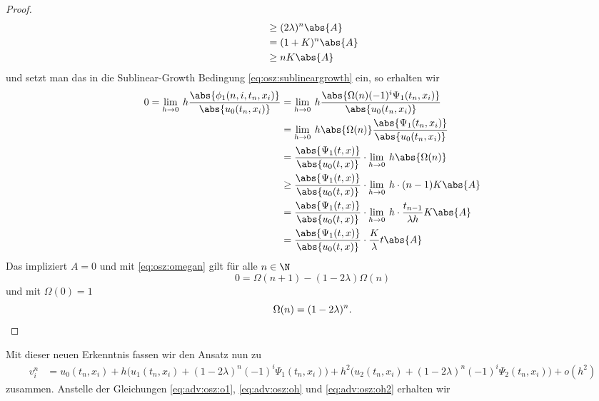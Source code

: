 \begin{proof}
\begin{align*}
&\geq (2 \lambda)^n \abs{A}\\
&= (1 + K)^n \abs{A}\\
&\geq n K  \abs{A}\\
\end{align*}
und setzt man das in die Sublinear-Growth Bedingung \eqref{eq:osz:sublineargrowth} ein, so erhalten wir
\begin{align*}
0 = \lim_{h \to 0} \: h \frac{\abs{\phi_1(n, i, t_n, x_i)}}{\abs{u_0(t_n, x_i)}}
&= \lim_{h \to 0} \: h \frac{\abs{\Omega(n) (-1)^i \Psi_1(t_n, x_i)}}{\abs{u_0(t_n, x_i)}}\\
&= \lim_{h \to 0} \: h \abs{\Omega(n)} \frac{\abs{\Psi_1(t_n, x_i)}}{\abs{u_0(t_n, x_i)}}\\
&= \frac{\abs{\Psi_1(t, x)}}{\abs{u_0(t, x)}} \cdot \lim_{h \to 0} \: h \abs{\Omega(n)}\\
&\geq \frac{\abs{\Psi_1(t, x)}}{\abs{u_0(t, x)}} \cdot \lim_{h \to 0} \: h \cdot (n-1) K \abs{A}\\
&= \frac{\abs{\Psi_1(t, x)}}{\abs{u_0(t, x)}} \cdot \lim_{h \to 0} \: h \cdot \frac{t_{n-1}}{\lambda h} K \abs{A}\\
&= \frac{\abs{\Psi_1(t, x)}}{\abs{u_0(t, x)}} \cdot \frac{K}{\lambda} t \abs{A}\\
\end{align*}
Das impliziert $A = 0$ und mit \eqref{eq:osz:omegan} gilt für alle $n \in \N$
\[ 0 = \Omega(n+1) - (1 - 2\lambda) \Omega(n) \]
und mit $\Omega(0) = 1$
\[ \Omega(n) = (1 - 2\lambda)^n. \qedhere \]
\end{proof}
\noindent Mit dieser neuen Erkenntnis fassen wir den Ansatz nun zu
{\footnotesize
\begin{align*}
v^n_i &= u_0(t_n, x_i) + h \bigl(u_1(t_n, x_i) + (1 - 2\lambda)^n (-1)^i \Psi_1(t_n, x_i)\bigr) + h^2 \bigl( u_2(t_n, x_i) + (1 - 2\lambda)^n (-1)^i \Psi_2(t_n, x_i) \bigr) + o(h^2)
\end{align*}
}
zusammen. Anstelle der Gleichungen \eqref{eq:adv:osz:o1}, \eqref{eq:adv:osz:oh} und \eqref{eq:adv:osz:oh2} erhalten wir
